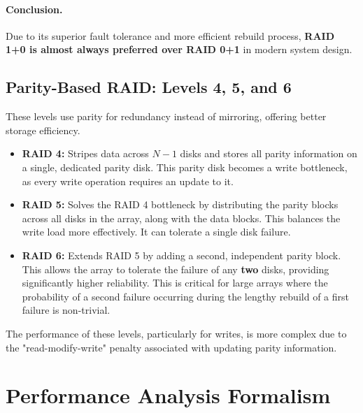\documentclass[12pt]{article}
\begin{document}
\paragraph{Conclusion.} Due to its superior fault tolerance and more efficient rebuild process, \textbf{RAID 1+0 is almost always preferred over RAID 0+1} in modern system design.

\newpage
\subsection{Parity-Based RAID: Levels 4, 5, and 6}
These levels use parity for redundancy instead of mirroring, offering better storage efficiency.

\begin{itemize}
    \item \textbf{RAID 4:} Stripes data across $N-1$ disks and stores all parity information on a single, dedicated parity disk. This parity disk becomes a write bottleneck, as every write operation requires an update to it.
    \item \textbf{RAID 5:} Solves the RAID 4 bottleneck by distributing the parity blocks across all disks in the array, along with the data blocks. This balances the write load more effectively. It can tolerate a single disk failure.
    \item \textbf{RAID 6:} Extends RAID 5 by adding a second, independent parity block. This allows the array to tolerate the failure of any \textbf{two} disks, providing significantly higher reliability. This is critical for large arrays where the probability of a second failure occurring during the lengthy rebuild of a first failure is non-trivial.
\end{itemize}

The performance of these levels, particularly for writes, is more complex due to the "read-modify-write" penalty associated with updating parity information.

\newpage
\section{Performance Analysis Formalism}
\end{document}

